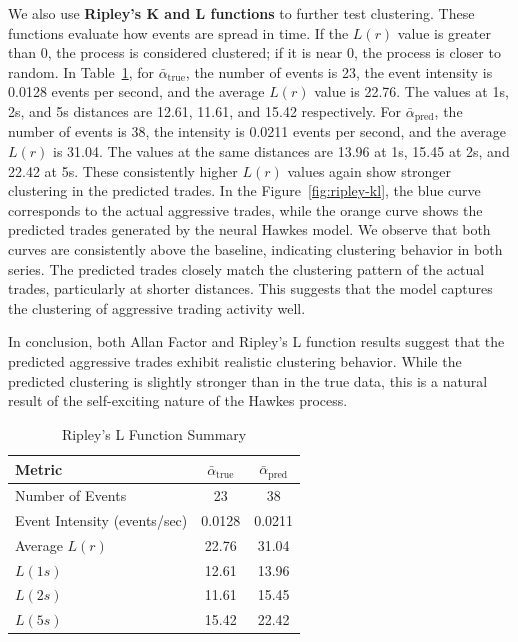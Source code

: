 We also use \textbf{Ripley's K and L functions} to further test clustering. These functions evaluate how events are spread in time. If the \( L(r) \) value is greater than 0, the process is considered clustered; if it is near 0, the process is closer to random. In Table~\ref{tb:ripley-l}, for $\bar{\alpha}_\text{true}$, the number of events is 23, the event intensity is 0.0128 events per second, and the average \( L(r) \) value is 22.76. The values at 1s, 2s, and 5s distances are 12.61, 11.61, and 15.42 respectively. For $\bar{\alpha}_\text{pred}$, the number of events is 38, the intensity is 0.0211 events per second, and the average \( L(r) \) is 31.04. The values at the same distances are 13.96 at 1s, 15.45 at 2s, and 22.42 at 5s. These consistently higher \( L(r) \) values again show stronger clustering in the predicted trades. In the Figure~\ref{fig:ripley-kl}, the blue curve corresponds to the actual aggressive trades, while the orange curve shows the predicted trades generated by the neural Hawkes model. We observe that both curves are consistently above the baseline, indicating clustering behavior in both series. The predicted trades closely match the clustering pattern of the actual trades, particularly at shorter distances. This suggests that the model captures the clustering of aggressive trading activity well.

In conclusion, both Allan Factor and Ripley's L function results suggest that the predicted aggressive trades exhibit realistic clustering behavior. While the predicted clustering is slightly stronger than in the true data, this is a natural result of the self-exciting nature of the Hawkes process.

\begin{table}[H]
    \centering
    \caption{Ripley's L Function Summary}
    \label{tb:ripley-l}
    \begin{tabular}{lcc}
    \toprule
    \textbf{Metric} & $\bar{\alpha}_\text{true}$ & $\bar{\alpha}_\text{pred}$ \\
    \midrule
    Number of Events & 23 & 38 \\
    Event Intensity (events/sec) & 0.0128 & 0.0211 \\
    Average \( L(r) \) & 22.76 & 31.04 \\
    \( L(1s) \) & 12.61 & 13.96 \\
    \( L(2s) \) & 11.61 & 15.45 \\
    \( L(5s) \) & 15.42 & 22.42 \\
    \bottomrule
    \end{tabular}
\end{table}

